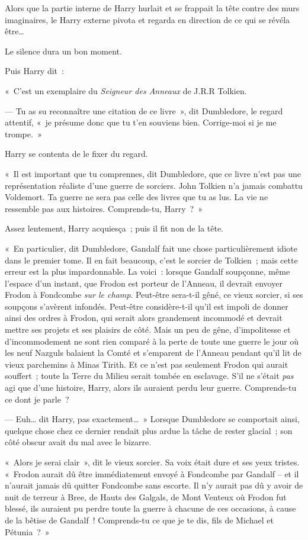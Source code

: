 Alors que la partie interne de Harry hurlait et se frappait la tête contre des murs imaginaires, le Harry externe pivota et regarda en direction de ce qui se révéla être…

Le silence dura un bon moment.

Puis Harry dit~:

«~C'est un exemplaire du \emph{Seigneur des Anneaux} de J.R.R Tolkien.

--- Tu as su reconnaître une citation de ce livre~», dit Dumbledore, le regard attentif, «~je présume donc que tu t'en souviens bien.
Corrige-moi si je me trompe.~»

Harry se contenta de le fixer du regard.

«~Il est important que tu comprennes, dit Dumbledore, que ce livre n'est pas une représentation réaliste d'une guerre de sorciers.
John Tolkien n'a jamais combattu Voldemort.
Ta guerre ne sera pas celle des livres que tu as lus.
La vie ne ressemble pas aux histoires.
Comprends-tu, Harry~?~»

Assez lentement, Harry acquiesça~; puis il fit non de la tête.

«~En particulier, dit Dumbledore, Gandalf fait une chose particulièrement idiote dans le premier tome.
Il en fait beaucoup, c'est le sorcier de Tolkien~; mais cette erreur est la plus impardonnable.
La voici~: lorsque Gandalf soupçonne, même l'espace d'un instant, que Frodon est porteur de l'Anneau, il devrait envoyer Frodon à Fondcombe \emph{sur le champ}.
Peut-être sera-t-il gêné, ce vieux sorcier, si ses soupçons s'avèrent infondés.
Peut-être considère-t-il qu'il est impoli de donner ainsi des ordres à Frodon, qui serait alors grandement incommodé et devrait mettre ses projets et ses plaisirs de côté.
Mais un peu de gêne, d'impolitesse et d'incommodement ne sont rien comparé à la perte de toute une guerre le jour où les neuf Nazguls balaient la Comté et s'emparent de l'Anneau pendant qu'il lit de vieux parchemins à Minas Tirith.
Et ce n'est pas seulement Frodon qui aurait souffert~; toute la Terre du Milieu serait tombée en esclavage.
S'il ne s'était \emph{pas} agi que d'une histoire, Harry, alors ils auraient perdu leur guerre.
Comprends-tu ce dont je parle~?

--- Euh… dit Harry, pas exactement…~»
Lorsque Dumbledore se comportait ainsi, quelque chose chez ce dernier rendait plus ardue la tâche de rester glacial~; son côté obscur avait du mal avec le bizarre.

«~Alors je serai clair~», dit le vieux sorcier.
Sa voix était dure et ses yeux tristes.
«~Frodon aurait dû être immédiatement envoyé à Fondcombe par Gandalf -- et il n'aurait jamais dû quitter Fondcombe sans escorte.
Il n'y aurait pas dû y avoir de nuit de terreur à Bree, de Hauts des Galgals, de Mont Venteux où Frodon fut blessé, ils auraient pu perdre toute la guerre à chacune de ces occasions, à cause de la bêtise de Gandalf~!
Comprends-tu ce que je te dis, fils de Michael et Pétunia~?~»

